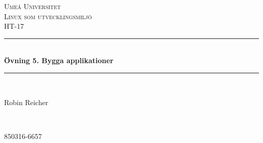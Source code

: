 \documentclass[11pt]{article}
\begin{document}

\begin{titlepage} %
	\newcommand{\HRule}{\rule{\linewidth}{0.5mm}} %

	\center %


	\textsc{\LARGE Umeå Universitet}\\[1.5cm] %

	\textsc{\Large Linux som utvecklingsmiljö}\\[0.5cm] %

	\textsc{\large HT-17}\\[0.5cm] %


	\HRule\\[0.4cm]

	{\huge\bfseries Övning 5. Bygga applikationer}\\[0.4cm] %

	\HRule\\[1.5cm]


	\begin{minipage}{0.4\textwidth}
		\begin{flushleft}
			\large
			Robin Reicher
		\end{flushleft}
	\end{minipage}
	~
	\begin{minipage}{0.4\textwidth}
		\begin{flushright}
			\large
			850316-6657
		\end{flushright}
	\end{minipage}



\end{titlepage}
\end{document}
